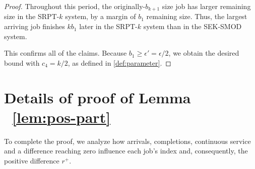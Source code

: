 \documentclass[acmsmall]{acmart}
\begin{document}
\begin{proof}
    Throughout this period, the originally-$b_{k+1}$ size job has larger remaining size in the SRPT-$k$ system, by a margin of $b_1$ remaining size.
    Thus, the largest arriving job finishes $k b_1$ later in the SRPT-$k$ system than in the SEK-SMOD system.

    This confirms all of the claims. Because $b_1 \ge \epsilon' = \epsilon/2$,
    we obtain the desired bound with $c_4 = k/2$, as defined in \cref{def:parameter}.
\end{proof}



\section[Details of Proof of Lemma ~\ref{lem:pos-part}]{Details of proof of Lemma ~\ref{lem:pos-part}}
\label{ap:pos-part}

To complete the proof, we analyze how arrivals, completions, continuous service and a difference reaching zero influence each job's index and, consequently, the positive difference $r^+$.
\end{document}
